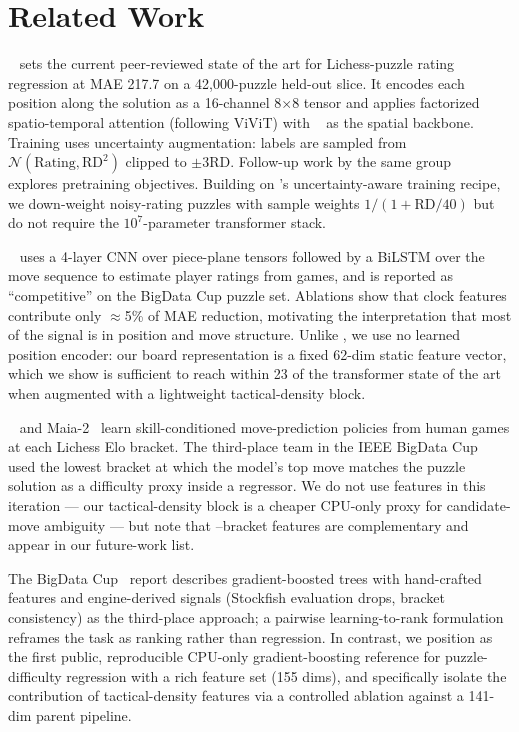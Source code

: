 \section{Related Work}
\label{sec:related}

\glickformer~\citep{milosz2024glickformer} sets the current peer-reviewed state of the art for Lichess-puzzle rating regression at MAE 217.7 on a 42{,}000-puzzle held-out slice. It encodes each position along the solution as a 16-channel 8$\times$8 tensor and applies factorized spatio-temporal attention (following ViViT) with \chessformer~\citep{monroe2024chessformer} as the spatial backbone. Training uses uncertainty augmentation: labels are sampled from $\mathcal{N}(\text{Rating}, \text{RD}^2)$ clipped to $\pm3\text{RD}$. Follow-up work by the same group~\citep{milosz2024pretraining} explores pretraining objectives. Building on \glickformer's uncertainty-aware training recipe, we down-weight noisy-rating puzzles with sample weights $1/(1 + \text{RD}/40)$ but do not require the $10^7$-parameter transformer stack.

\ratingnet~\citep{omori2024ratingnet} uses a 4-layer CNN over piece-plane tensors followed by a BiLSTM over the move sequence to estimate player ratings from games, and is reported as ``competitive'' on the BigData Cup puzzle set. Ablations show that clock features contribute only $\approx$5\% of MAE reduction, motivating the interpretation that most of the signal is in position and move structure. Unlike \ratingnet, we use no learned position encoder: our board representation is a fixed 62-dim static feature vector, which we show is sufficient to reach within 23 \elo of the transformer state of the art when augmented with a lightweight tactical-density block.

\maia~\citep{mcilroy2020aligning} and Maia-2~\citep{jacob2024maia2} learn skill-conditioned move-prediction policies from human games at each Lichess Elo bracket. The third-place team in the IEEE BigData Cup~\citep{ieee2024cup} used the lowest \maia bracket at which the model's top move matches the puzzle solution as a difficulty proxy inside a \lightgbm regressor. We do not use \maia features in this iteration --- our tactical-density block is a cheaper CPU-only proxy for candidate-move ambiguity --- but note that \maia--bracket features are complementary and appear in our future-work list.

The BigData Cup~\citep{ieee2024cup} report describes gradient-boosted trees with hand-crafted features and engine-derived signals (Stockfish evaluation drops, \maia bracket consistency) as the third-place approach; a pairwise learning-to-rank formulation~\citep{ieee2024pairwise} reframes the task as ranking rather than regression. In contrast, we position \ours as the first public, reproducible CPU-only gradient-boosting reference for puzzle-difficulty regression with a rich feature set (155 dims), and specifically isolate the contribution of tactical-density features via a controlled ablation against a 141-dim parent pipeline.

